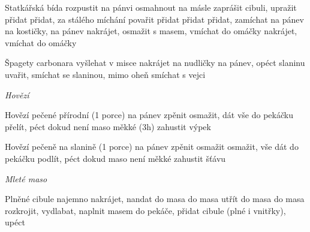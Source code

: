 \documentclass[12pt,a4paper]{article}
\begin{document}
\begin{recipe}{Statkářská bída}
   rozpustit na pánvi
   osmahnout na másle
   zaprášit cibuli, upražit
   přidat
   přidat, za stálého míchání povařit
   přidat
   přidat
   přidat, zamíchat
   na pánev
   na kostičky, na pánev
   nakrájet, osmažit s masem, vmíchat do omáčky
   nakrájet, vmíchat do omáčky
\end{recipe}
\newpage

\begin{recipe}{Špagety carbonara}
   vyšlehat v misce
   nakrájet na nudličky
   na pánev, opéct slaninu
   uvařit, smíchat se slaninou, mimo oheň smíchat s vejci
\end{recipe}
\newpage

\vspace*{\fill}
\hfill {\Huge\it Hovězí}\hfill
\vspace*{\fill}
\newpage

\begin{recipe}{Hovězí pečené přírodní (1 porce)}
   na pánev
   zpěnit
   osmažit, dát vše do pekáčku
   přelít, péct dokud není maso měkké (3h)
   zahustit výpek
\end{recipe}
\newpage

\begin{recipe}{Hovězí pečeně na slanině (1 porce)}
   na pánev
   zpěnit
   osmažit
   osmažit, vše dát do pekáčku
   podlít, péct dokud maso není měkké
   zahustit šťávu 
\end{recipe}
\newpage

\vspace*{\fill}
\hfill {\Huge\it Mleté maso}\hfill
\vspace*{\fill}
\newpage

\begin{recipe}{Plněné cibule}
   najemno nakrájet, nandat do masa
   do masa
   utřít do masa
   do masa
   rozkrojit, vydlabat, naplnit masem
   do pekáče, přidat cibule (plné i vnitřky), upéct
\end{recipe}
\newpage
\end{document}

